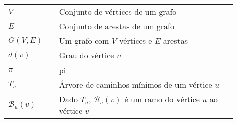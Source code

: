 

\begin{listasimb}

\begin{longtable}[l]{p{0.2\linewidth}p{0.7\linewidth}}
	$V$					& Conjunto de vértices de um grafo \\
	$E$					& Conjunto de arestas de um grafo \\
	$G(V, E)$			& Um grafo com $V$ vértices e $E$ arestas \\
	$d(v)$ 				& Grau do vértice $v$ \\
	$\pi$ 				& pi \\
	$T_u$ 				& Árvore de caminhos mínimos de um vértice $u$ \\
	$\mathcal{B}_u(v)$	& Dado $T_u$, $\mathcal{B}_u(v)$ é um ramo do vértice $u$ ao vértice $v$ \\
\end{longtable}

\end{listasimb}

